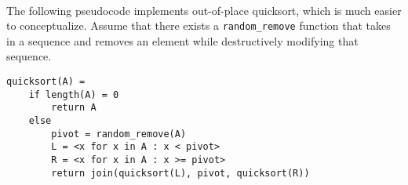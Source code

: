 \documentclass{article}
\begin{document}
\paragraph{} The following pseudocode implements out-of-place quicksort, which is much easier to conceptualize. Assume that there exists a \texttt{random\_remove} function that takes in a sequence and removes an element while destructively modifying that sequence.

\begin{verbatim}
quicksort(A) =
    if length(A) = 0
        return A
    else
        pivot = random_remove(A)
        L = <x for x in A : x < pivot>
        R = <x for x in A : x >= pivot>
        return join(quicksort(L), pivot, quicksort(R))
\end{verbatim}
\end{document}
